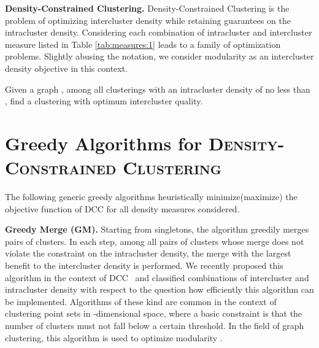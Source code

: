 \documentclass{llncs}
\newcommand{\algo}[1]{\textsc{#1}}
\newcommand{\andreapar}{\vspace*{.5ex}\par\noindent}
\begin{document}
\setlength{\extrarowheight}{0pt}
\andreapar\textbf{Density-Constrained Clustering.}
Density-Constrained Clustering is the problem of optimizing intercluster density while retaining guarantees on the intracluster density.
Considering each combination of intracluster and intercluster measure listed in Table \ref{tab:measures:1} leads to a family of optimization problems.
Slightly abusing the notation, we consider modularity as an intercluster density objective in this context.
\vspace{-2ex}
\begin{problem}[\algo{Density-Constrained Clustering(DCC)}]
  Given a graph , among all clusterings with an intracluster density of no less than , find a clustering  with optimum intercluster quality.
\end{problem}
\section{Greedy Algorithms for \textsc{Density-Constrained Clustering}}
The following generic greedy algorithms heuristically minimize(maximize) the objective function of \textsc{DCC} for all density measures considered.  
\andreapar\textbf{Greedy Merge (GM).}
Starting from singletons, the algorithm greedily merges pairs of clusters. In each step, among all pairs of clusters whose merge does not violate the constraint on the intracluster density, the merge with the largest benefit to the intercluster density is performed.
We recently proposed this algorithm in the context of DCC~\cite{gsw-dcgc-11b} and  classified combinations of intercluster and intracluster density with respect to the question how efficiently this algorithm can be implemented.
Algorithms of these kind are common in the context of clustering point sets in -dimensional space, where a basic constraint is that the number of clusters must not fall below a certain threshold. In the field of graph clustering, this algorithm is used to optimize modularity \cite{cnm-fcsln-04}.
\end{document}
